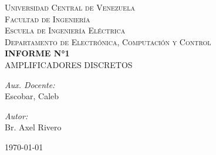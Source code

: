 
\begin{titlepage}
    \begin{center}
        \textsc{\large Universidad Central de Venezuela}\\
        \textsc{\large Facultad de Ingeniería}\\
        \textsc{\large Escuela de Ingeniería Eléctrica}\\
        \textsc{\large Departamento de Electrónica, Computación y Control}\\[7cm]
        
        {\huge \bfseries INFORME N°1}\\[0.2cm]
        {\Large AMPLIFICADORES DISCRETOS}\\[10cm]
        
        \begin{minipage}{0.4\textwidth}
            \begin{flushleft}
                \emph{Aux. Docente:}\\
                Escobar, Caleb 
            \end{flushleft}
        \end{minipage}
        \begin{minipage}{0.4\textwidth}
            \begin{flushright}
                \emph{Autor:}\\
                Br. Axel Rivero
            \end{flushright}
        \end{minipage}
        
        \vfill
        
        {\large \today}
        
    \end{center}
\end{titlepage}
